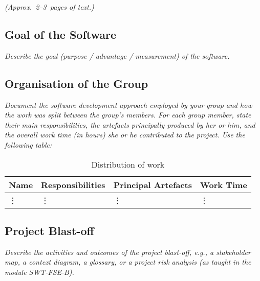 \flushleft
\emph{(Approx.~2--3~pages of text.)}

\subsection{Goal of the Software}

\emph{Describe the goal (purpose / advantage / measurement) of the software.}

\subsection{Organisation of the Group}

\emph{Document the software development approach employed by your group and how 
the work was split between the group's members. For each group member, state 
their main responsibilities, the artefacts principally produced by her or him, 
and the overall work time (in hours) she or he contributed to the project. Use 
the following table:}

\begin{table}[!h]
  \caption{Distribution of work}
  \centering
  \begin{tabular}{l||l|l|l|}
    Name & Responsibilities & Principal Artefacts & Work Time\\
    \hline
    \vdots&\vdots&\vdots&\vdots\\
  \end{tabular}
\end{table}

\subsection{Project Blast-off}

\emph{Describe the activities and outcomes of the project blast-off, e.g., a 
stakeholder map, a context diagram, a glossary, or a project risk analysis (as 
taught in the  module SWT-FSE-B).}
